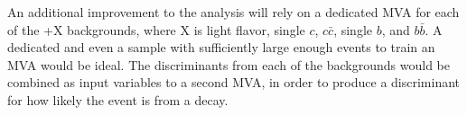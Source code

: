 \par  An additional improvement to the analysis will rely on a
dedicated MVA for each of the \ttbar+X backgrounds, where X is light
flavor, single $c$, $c\bar{c}$, single $b$, and $b\bar{b}$.  A
dedicated \ttbb and even a \ttcc sample with sufficiently large enough
events to train an MVA would be ideal.  The discriminants from each of
the backgrounds would be combined as input variables to a second MVA,
in order to produce a discriminant for how likely the event is from a
\ttH decay.  

